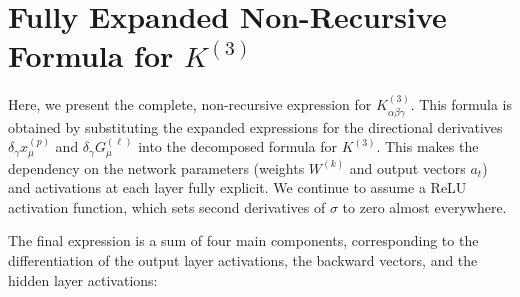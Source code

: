 \documentclass[a4paper]{article}
\begin{document}
\section{Fully Expanded Non-Recursive Formula for $K^{(3)}$}

Here, we present the complete, non-recursive expression for $K^{(3)}_{\alpha\beta\gamma}$. This formula is obtained by substituting the expanded expressions for the directional derivatives $\delta_\gamma x^{(p)}_\mu$ and $\delta_\gamma G^{(\ell)}_\mu$ into the decomposed formula for $K^{(3)}$. This makes the dependency on the network parameters (weights $W^{(k)}$ and output vectors $a_t$) and activations at each layer fully explicit. We continue to assume a ReLU activation function, which sets second derivatives of $\sigma$ to zero almost everywhere.

The final expression is a sum of four main components, corresponding to the differentiation of the output layer activations, the backward vectors, and the hidden layer activations:
\end{document}
